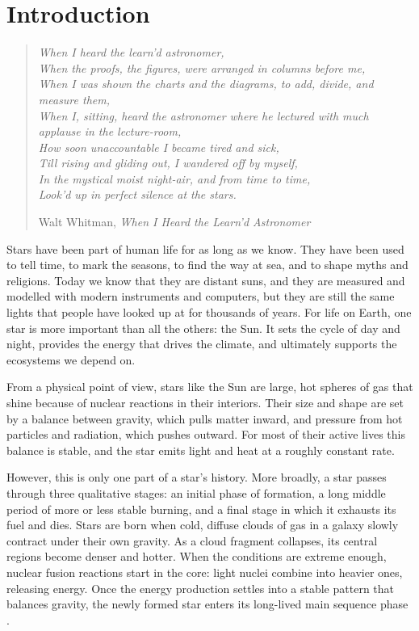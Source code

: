 \chapter{Introduction}
\label{chap:introduction}

\begin{quote}\itshape
When I heard the learn’d astronomer,\\
When the proofs, the figures, were arranged in columns before me,\\
When I was shown the charts and the diagrams, to add, divide, and measure them,\\
When I, sitting, heard the astronomer where he lectured with much applause in the lecture-room,\\
How soon unaccountable I became tired and sick,\\
Till rising and gliding out, I wandered off by myself,\\
In the mystical moist night-air, and from time to time,\\
Look’d up in perfect silence at the stars.
\par\raggedleft
Walt Whitman, \emph{When I Heard the Learn’d Astronomer}\cite{Whitman1855}
\end{quote}

Stars have been part of human life for as long as we know. They have been used
to tell time, to mark the seasons, to find the way at sea, and to shape myths
and religions. Today we know that they are distant suns, and they are measured
and modelled with modern instruments and computers, but they are still the
same lights that people have looked up at for thousands of years. For life on
Earth, one star is more important than all the others: the Sun. It sets the
cycle of day and night, provides the energy that drives the climate, and
ultimately supports the ecosystems we depend on.

From a physical point of view, stars like the Sun are large, hot spheres of gas
that shine because of nuclear reactions in their interiors. Their size and
shape are set by a balance between gravity, which pulls matter inward, and
pressure from hot particles and radiation, which pushes outward. For most of
their active lives this balance is stable, and the star emits light and heat at
a roughly constant rate. 

However, this is only one part of a star's history. More broadly, a star passes
through three qualitative stages: an initial phase of formation, a long middle
period of more or less stable burning, and a final stage in which it exhausts
its fuel and dies. Stars are born when cold, diffuse clouds of gas in a galaxy
slowly contract under their own gravity. As a cloud fragment collapses, its
central regions become denser and hotter. When the conditions are extreme
enough, nuclear fusion reactions start in the core: light nuclei combine into
heavier ones, releasing energy. Once the energy production settles into a
stable pattern that balances gravity, the newly formed star enters its
long-lived main sequence phase \cite{HansenKawalerTrimble2004}.

